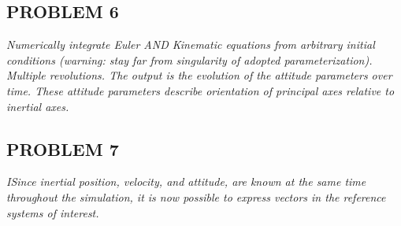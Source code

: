 




\subsection{PROBLEM 6}
\textit{Numerically integrate Euler AND Kinematic equations from arbitrary initial conditions (warning: stay far from singularity of adopted parameterization). Multiple revolutions. The output is the evolution of the attitude parameters over time. These attitude parameters describe orientation of principal axes relative to inertial axes.}


\subsection{PROBLEM 7}
\textit{ISince inertial position, velocity, and attitude, are known at the same time throughout the simulation, it is now possible to express vectors in the reference systems of interest.}

